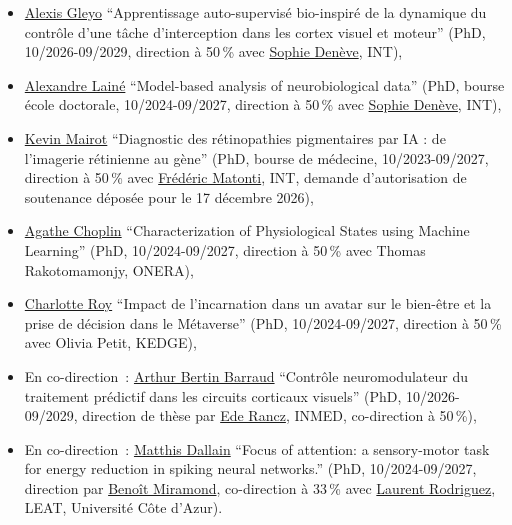 \documentclass[10pt,french,a4paper,oneside]{article}%
\begin{document}
\begin{itemize}
	\item \href{https://laurentperrinet.github.io/author/alexis-gleyo/}{Alexis Gleyo} ``Apprentissage auto-supervisé bio-inspiré de la dynamique du contrôle d'une tâche d'interception dans les cortex visuel et moteur'' (PhD, 10/2026-09/2029, direction à 50\,\% avec \href{https://laurentperrinet.github.io/author/sophie-den%C3%A8ve/}{Sophie Denève}, INT),
	\item \href{https://laurentperrinet.github.io/author/alexandre-lain%C3%A9/}{Alexandre Lainé} ``Model-based analysis of neurobiological data'' (PhD, bourse école doctorale, 10/2024-09/2027, direction à 50\,\% avec \href{https://laurentperrinet.github.io/author/sophie-den%C3%A8ve/}{Sophie Denève}, INT),
	\item \href{https://laurentperrinet.github.io/author/kevin-mairot/}{Kevin Mairot} ``Diagnostic des rétinopathies pigmentaires par IA : de l'imagerie rétinienne au gène'' (PhD, bourse de médecine, 10/2023-09/2027, direction à 50\,\% avec \href{https://laurentperrinet.github.io/author/frederic-matonti/}{Frédéric Matonti}, INT, demande d'autorisation de soutenance déposée pour le 17 décembre 2026),
	\item \href{https://laurentperrinet.github.io/author/agathe-choplin/}{Agathe Choplin} ``Characterization of Physiological States using Machine Learning'' (PhD, 10/2024-09/2027, direction à 50\,\% avec Thomas Rakotomamonjy, ONERA),
	\item \href{https://laurentperrinet.github.io/author/charlotte-roy/}{Charlotte Roy} ``Impact de l'incarnation dans un avatar sur le bien-être et la prise de décision dans le Métaverse'' (PhD, 10/2024-09/2027, direction à 50\,\% avec Olivia Petit, KEDGE),
	\item En co-direction~: \href{https://laurentperrinet.github.io/author/arthur-bertin-barraud/}{Arthur Bertin Barraud} ``Contrôle neuromodulateur du traitement prédictif dans les circuits corticaux visuels'' (PhD, 10/2026-09/2029, direction de thèse par \href{https://laurentperrinet.github.io/author/ede-rancz/}{Ede Rancz}, INMED, co-direction à 50\,\%),
	\item En co-direction~: \href{https://laurentperrinet.github.io/author/matthis-dallain/}{Matthis Dallain} ``Focus of attention: a sensory-motor task for energy reduction in spiking neural networks.'' (PhD, 10/2024-09/2027, direction par \href{https://laurentperrinet.github.io/author/beno%C3%AEt-miramond/}{Benoît Miramond}, co-direction à 33\,\% avec \href{https://laurentperrinet.github.io/author/laurent-rodriguez/}{Laurent Rodriguez}, LEAT, Université Côte d'Azur).
\end{itemize}
\end{document}
